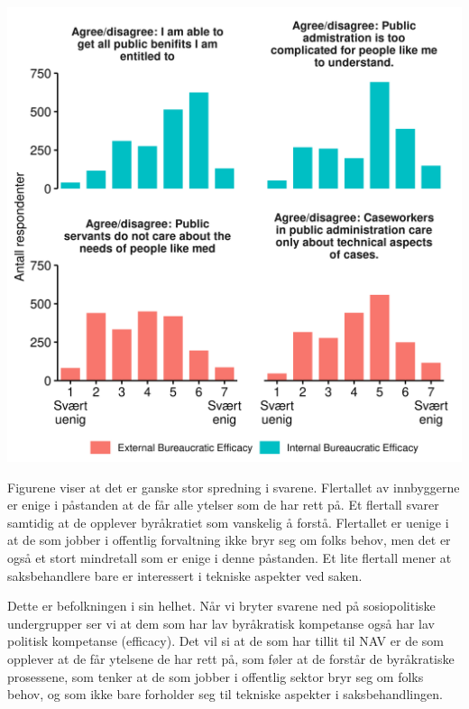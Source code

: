 \documentclass[
]{book}
\begin{document}
\includegraphics{figs/png/fig_be_hist.png}

Figurene viser at det er ganske stor spredning i svarene.
Flertallet av innbyggerne er enige i påstanden at de får alle ytelser som de har rett på.
Et flertall svarer samtidig at de opplever byråkratiet som vanskelig å forstå.
Flertallet er uenige i at de som jobber i offentlig forvaltning ikke bryr seg om folks behov, men det er også et stort mindretall som er enige i denne påstanden.
Et lite flertall mener at saksbehandlere bare er interessert i tekniske aspekter ved saken.

Dette er befolkningen i sin helhet.
Når vi bryter svarene ned på sosiopolitiske undergrupper ser vi at dem som har lav byråkratisk kompetanse også har lav politisk kompetanse (efficacy).
Det vil si at de som har tillit til NAV er de som opplever at de får ytelsene de har rett på, som føler at de forstår de byråkratiske prosessene, som tenker at de som jobber i offentlig sektor bryr seg om folks behov, og som ikke bare forholder seg til tekniske aspekter i saksbehandlingen.
\end{document}

